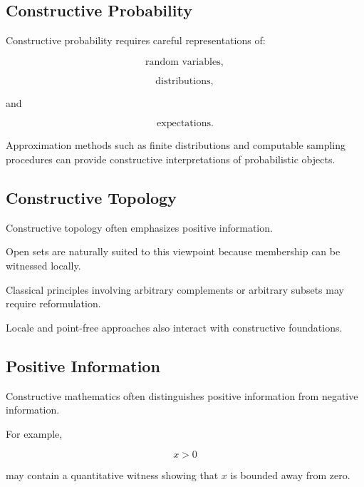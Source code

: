 \subsection{Constructive Probability}
\label{subsec:constructive-probability}

Constructive probability requires careful representations of:

\[
\boxed{
\text{random variables},
}
\]

\[
\boxed{
\text{distributions},
}
\]

and

\[
\boxed{
\text{expectations}.
}
\]

Approximation methods such as finite distributions and computable sampling
procedures can provide constructive interpretations of probabilistic
objects.

\subsection{Constructive Topology}
\label{subsec:constructive-topology}

Constructive topology often emphasizes positive information.

Open sets are naturally suited to this viewpoint because membership can be
witnessed locally.

Classical principles involving arbitrary complements or arbitrary
subsets may require reformulation.

Locale and point-free approaches also interact with constructive
foundations.

\subsection{Positive Information}
\label{subsec:positive-information-constructive}

Constructive mathematics often distinguishes positive information from
negative information.

For example,

\[
\boxed{
x>0
}
\]

may contain a quantitative witness showing that \(x\) is bounded away from
zero.

